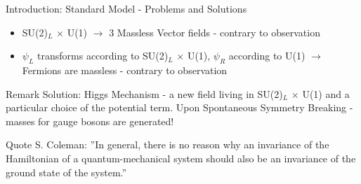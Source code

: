 \documentclass[pdf, 9pt]{beamer}
\begin{document}
  \begin{frame}{Introduction: Standard Model - Problems and Solutions}
    \begin{itemize}
      \item SU(2)$_L$ $\times$ U(1) $\rightarrow$ 3 Massless Vector fields - contrary to observation
      \item $\psi_L$ transforms according to SU(2)$_L$ $\times$ U(1), $\psi_R$ according to U(1) $\rightarrow$ Fermions are massless - contrary to observation
    \end{itemize}
    \begin{block}{Remark}
      Solution: Higgs Mechanism - a new field living in SU(2)$_L$ $\times$ U(1) and a particular choice of the potential term. Upon Spontaneous Symmetry Breaking - masses for gauge bosons are generated!
    \end{block}
    \begin{block}{Quote}
      S. Coleman: ''In general, there is no reason why an invariance of the Hamiltonian of a quantum-mechanical system should also be an invariance of the ground state of the system.''
    \end{block}
  \end{frame}
\end{document}
